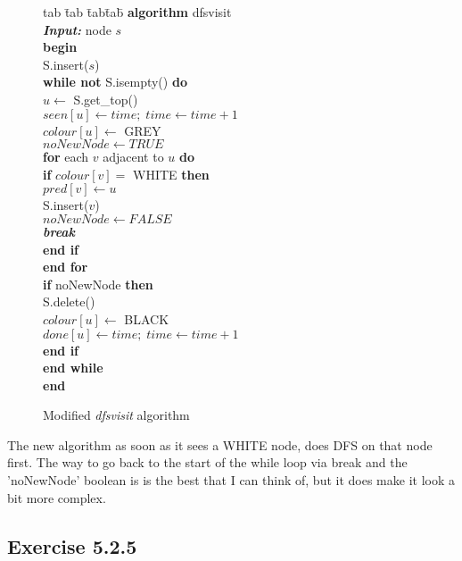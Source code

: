 \documentclass{article}
\begin{document}
\begin{figure}
\begin{tabbing}
tab \=tab \= tab\= tab\= \kill
\textbf{algorithm} dfsvisit \\
\> \textbf{\emph{Input:}} node \(s\)\\
\textbf{begin} \\\> S.insert(\(s\)) \\
\> \textbf{while not} S.isempty() \textbf{do} \\
\> \> \(u \leftarrow\) S.get\_top() \\
\> \> \(seen[u] \leftarrow time;\; time \leftarrow time+1\) \\
\> \> \(colour[u] \leftarrow\) GREY \\
\> \> \(noNewNode \leftarrow TRUE\) \\
\> \> \textbf{for} each \(v\) adjacent to \(u\) \textbf{do} \\
\> \> \> \textbf{if} \(colour[v] =\) WHITE \textbf{then} \\
\> \> \> \> \( pred[v] \leftarrow u\) \\
\> \> \> \> S.insert(\(v\)) \\
\> \> \> \> \( noNewNode \leftarrow FALSE \) \\
\> \> \> \> \textbf{\emph{break}} \\
\> \> \> \textbf{end if} \\
\> \> \textbf{end for} \\
\> \> \textbf{if} noNewNode \textbf{then} \\
\> \> \> S.delete() \\ 
\> \> \> \(colour[u] \leftarrow \) BLACK \\
\> \> \> \(done[u] \leftarrow time;\; time \leftarrow time +1\) \\
\> \> \textbf{end if} \\
\> \textbf{end while} \\
\textbf{end} \\
\end{tabbing}
\caption{Modified \emph{dfsvisit} algorithm} 
\label{fig:dfsvisitmod}
\end{figure}

The new algorithm as soon as it sees a WHITE node, does DFS on that node first. The way to go back to the start of the while loop via break and the 'noNewNode' boolean is is the best that I can think of, but it does make it look a bit more complex.


\subsection*{Exercise 5.2.5}
\end{document}
